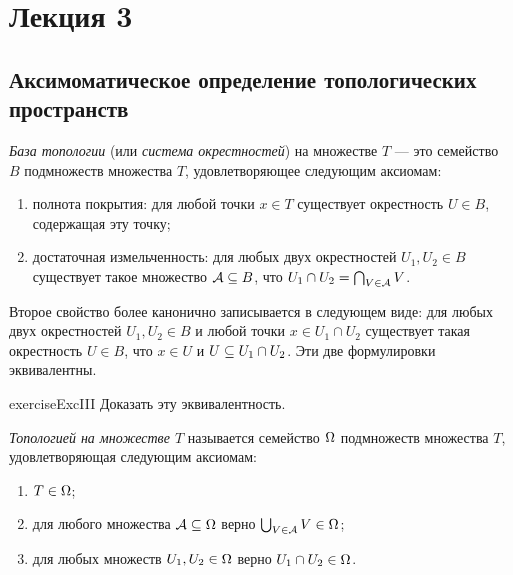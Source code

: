 \documentclass[main]{subfiles}
\begin{document}
\section{Лекция 3}

\subsection{Аксимоматическое определение топологических пространств}

\begin{definition}
	\emph{База топологии} (или \emph{система окрестностей}) на множестве $ T $ --- это семейство $ B $ подмножеств
	множества $ T $, удовлетворяющее следующим аксиомам:
	\begin{enumerate}
		\item полнота покрытия: для любой точки $ x \in T $ существует окрестность $ U \in B $, содержащая эту точку;
		\item достаточная измельченность: для любых двух окрестностей $ U_1, U_2 \in B $ существует такое множество
			$\mathcal{A} \subseteq B $, что $ U_1 \cap U_2 = \bigcap_{V \in \mathcal{A}} V $.
	\end{enumerate}
\end{definition}

\begin{remark}
	Второе свойство более канонично записывается в следующем виде: для любых двух окрестностей $ U_1, U_2 \in B $ и
	любой точки $ x \in U_1 \cap U_2 $ существует такая окрестность $ U \in B $, что $ x \in U $ и
	$ U \subseteq U_1 \cap U_2 $. Эти две формулировки эквивалентны.
\end{remark}

\begin{restatable}{exercise}{ExcIII}
	Доказать эту эквивалентность.
\end{restatable}

\begin{definition}
	\emph{Топологией на множестве $ T $} называется семейство $ \Omega $ подмножеств множества $ T $,
	удовлетворяющая следующим аксиомам:
	\begin{enumerate}
		\item $ T \in \Omega $;
		\item для любого множества $ \mathcal{A} \subseteq \Omega $ верно $ \bigcup_{V \in \mathcal{A}} V \in \Omega $;
		\item для любых множеств $ U_1, U_2 \in \Omega $ верно $ U_1 \cap U_2 \in \Omega $.
	\end{enumerate}
\end{definition}
\end{document}
